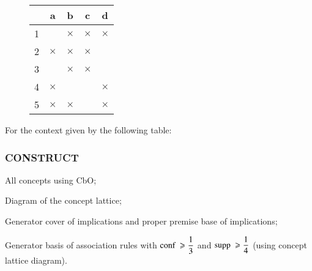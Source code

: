 \documentclass[12pt]{report}
\begin{document}
\boldmath
{}
\begin{problem}{}
    {\begin{wrapfigure}{r}{0.3\columnwidth} 
        \begin{flushright}
        \begin{tabular}{c|c|c|c|c|}
            & a & b & c & d \\ \hline
          1 &  & $\times$ & $\times$ & $\times$ \\ \hline
          2 & $\times$ & $\times$ & $\times$ &  \\ \hline
          3 &  & $\times$ & $\times$ &  \\ \hline
          4 & $\times$ &  &  & $\times$ \\ \hline
          5 & $\times$ & $\times$ &  & $\times$ \\ \hline
          \end{tabular}
        \end{flushright}
   \end{wrapfigure}
   For the context given by the following table:
   \subsubsection*{CONSTRUCT}
\begin{enumerate*}
    \item All concepts using CbO;
    \item Diagram of the concept lattice;
    \item Generator cover of implications and proper premise base of implications;
    \item Generator basis of association rules with $\text{conf\ } \geqslant \dfrac{1}{3}$ and $\text{supp\ } \geqslant \dfrac{1}{4}$ (using concept lattice diagram).
\end{enumerate*}}
\end{problem}
\end{document}
